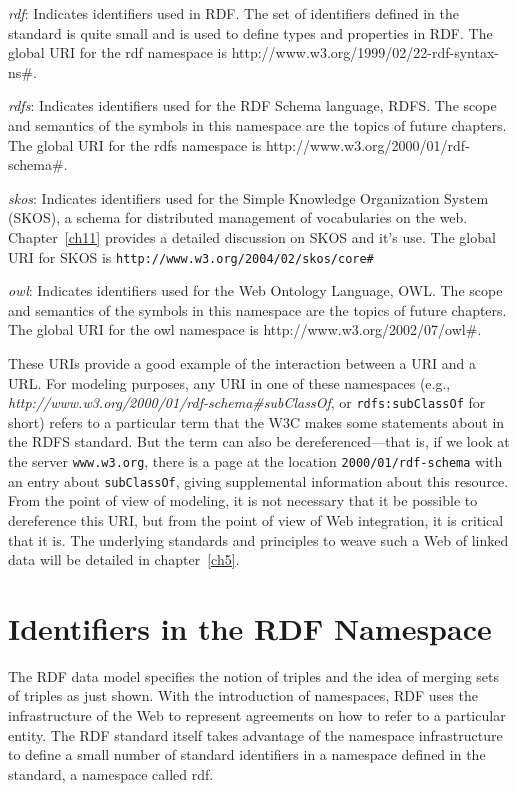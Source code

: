 \emph{rdf}: Indicates identifiers used in RDF. The set of identifiers defined
in the standard is quite small and is used to define types and
properties in RDF. The global URI for the rdf namespace is 
http://www.w3.org/1999/02/22-rdf-syntax-ns\#.

\emph{rdfs}: Indicates identifiers used for the RDF Schema language, RDFS. The
scope and semantics of the symbols in this namespace are the topics of
future chapters. The global URI for the rdfs namespace is
http://www.w3.org/2000/01/rdf-schema\#.

\emph{skos}: Indicates identifiers used for the Simple Knowledge Organization System (SKOS), a schema for
distributed management of vocabularies on the web.  
Chapter~\ref{ch11} provides a detailed discussion on SKOS and it's use.   The global URI  for SKOS  is
\texttt{http://www.w3.org/2004/02/skos/core\#}


\emph{owl}: Indicates identifiers used for the Web Ontology Language, OWL. The
scope and semantics of the symbols in this namespace are the topics of
future chapters. The global URI for the owl namespace is
http://www.w3.org/2002/07/owl\#.

These URIs provide a good example of the interaction between a URI and a
URL. For modeling purposes, any URI in one of these namespaces (e.g.,
\emph{http://www.w3.org/2000/01/rdf-schema\#subClassOf}, or
\texttt{rdfs:subClassOf} for short) refers to a particular term that the W3C
makes some statements about in the RDFS standard. But the term can also
be dereferenced---that is, if we look at the server
\texttt{www.w3.org}, there is a page at the location
\texttt{2000/01/rdf-schema} with an entry about \texttt{subClassOf}, giving supplemental
information about this resource. From the point of view of modeling, it
is not necessary that it be possible to dereference this URI, but from
the point of view of Web integration, it is critical that it is. The
underlying standards and principles to weave such a Web of linked data
will be detailed in chapter~\ref{ch5}.

\section{Identifiers in the RDF Namespace}

The RDF data model specifies the notion of triples and the idea of
merging sets of triples as just shown. With the introduction of
namespaces, RDF uses the infrastructure of the Web to represent
agreements on how to refer to a particular entity. The RDF standard itself takes
advantage of the namespace infrastructure to define a small number of
standard identifiers in a namespace defined in the standard, a namespace
called rdf.


